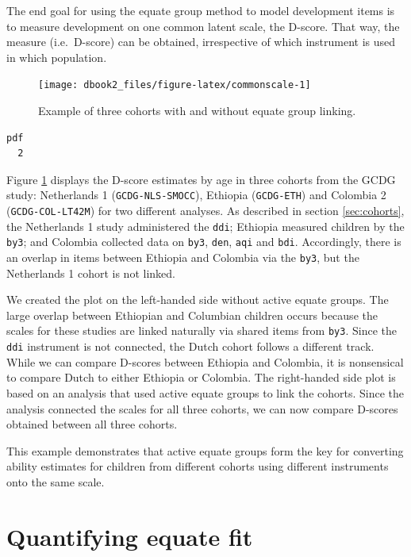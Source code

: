 \documentclass[
]{book}
\begin{document}
The end goal for using the equate group method to model development items is to measure development on one common latent scale, the D-score. That way, the measure (i.e.~D-score) can be obtained, irrespective of which instrument is used in which population.

\begin{figure}

{\centering \texttt{[image: dbook2\_files/figure-latex/commonscale-1]} 

}

\caption{Example of three cohorts with and without equate group linking.}\label{fig:commonscale}
\end{figure}

\begin{verbatim}
pdf 
  2 
\end{verbatim}



Figure \ref{fig:commonscale} displays the D-score estimates by age in three cohorts from the GCDG study: Netherlands 1 (\texttt{GCDG-NLS-SMOCC}), Ethiopia (\texttt{GCDG-ETH}) and Colombia 2 (\texttt{GCDG-COL-LT42M}) for two different analyses. As described in section \ref{sec:cohorts}, the Netherlands 1 study administered the \texttt{ddi}; Ethiopia measured children by the \texttt{by3}; and Colombia collected data on \texttt{by3}, \texttt{den}, \texttt{aqi} and \texttt{bdi}. Accordingly, there is an overlap in items between Ethiopia and Colombia via the \texttt{by3}, but the Netherlands 1 cohort is not linked.

We created the plot on the left-handed side without active equate groups. The large overlap between Ethiopian and Columbian children occurs because the scales for these studies are linked naturally via shared items from \texttt{by3}. Since the \texttt{ddi} instrument is not connected, the Dutch cohort follows a different track. While we can compare D-scores between Ethiopia and Colombia, it is nonsensical to compare Dutch to either Ethiopia or Colombia. The right-handed side plot is based on an analysis that used active equate groups to link the cohorts. Since the analysis connected the scales for all three cohorts, we can now compare D-scores obtained between all three cohorts.

This example demonstrates that active equate groups form the key for converting ability estimates for children from different cohorts using different instruments onto the same scale.

\hypertarget{sec:equatefit}{%
\section{Quantifying equate fit}\label{sec:equatefit}}
\end{document}
